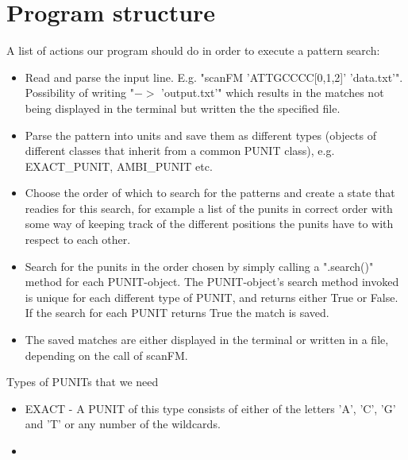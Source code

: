 \documentclass[12pt]{article}
\begin{document}
\section{Program structure}
A list of actions our program should do in order to execute a pattern search:
\begin{itemize}
\item Read and parse the input line. E.g. "scanFM 'ATTGCCCC[0,1,2]' 'data.txt'". Possibility of writing "$->$ 'output.txt'"
which results in the matches not being displayed in the terminal but written the the specified file.
\item Parse the pattern into units and save them as different types (objects of different classes that inherit
from a common PUNIT class), e.g. EXACT\_PUNIT, AMBI\_PUNIT etc.
\item Choose the order of which to search for the patterns and create a state that readies for this search, for example a 
list of the punits in correct order with some way of keeping track of the different positions the punits have to with
respect to each other.
\item Search for the punits in the order chosen by simply calling a ".search()" method for each PUNIT-object.
The PUNIT-object's search method invoked is unique for each different type of PUNIT, and returns either True or False.
If the search for each PUNIT returns True the match is saved.
\item The saved matches are either displayed in the terminal or written in a file, depending on the call of scanFM. 
\end{itemize}
Types of PUNITs that we need
\begin{itemize}
\item EXACT - A PUNIT of this type consists of either of the letters 'A', 'C', 'G' and 'T' or any number of the wildcards.
\item  
\end{itemize}
\end{document}
